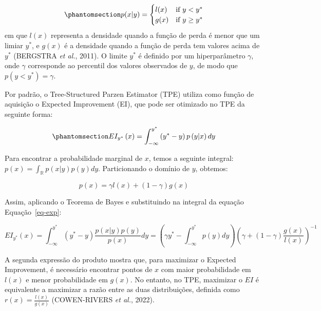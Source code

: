 \documentclass[
  12pt,
  a4paper,
]{scrreprt}
\begin{document}
\begin{equation}\phantomsection\label{eq-tpe}{
p(x|y) =
\begin{cases}
    l(x) & \text{if } y < y^* \\
    g(x) & \text{if } y \ge y^*
\end{cases}
}\end{equation} em que \(l\left(x\right)\) representa a densidade quando
a função de perda é menor que um limiar \(y^*\), e \(g\left(x\right)\) é
a densidade quando a função de perda tem valores acima de \(y^*\)
(BERGSTRA \emph{et al.}, 2011). O limite \(y^*\) é definido por um
hiperparâmetro \(\gamma\), onde \(\gamma\) corresponde ao percentil dos
valores observados de \(y\), de modo que
\(p\left(y < y^*\right) = \gamma\).

\vspace{12pt}

Por padrão, o Tree-Structured Parzen Estimator (TPE) utiliza como função
de aquisição o Expected Improvement (EI), que pode ser otimizado no TPE
da seguinte forma:

\begin{equation}\phantomsection\label{eq-exp}{
  EI_{y^*}\left(x\right) = \int_{-\infty}^{y^*} \left(y^* - y\right)p\left(y | x\right) dy
}\end{equation}

Para encontrar a probabilidade marginal de \(x\), temos a seguinte
integral:
\(p\left(x\right) = \int_{\mathbb{R}} p\left(x | y\right)p\left(y\right)dy\).
Particionando o domínio de \(y\), obtemos:

\[
p\left(x\right) = \gamma l\left(x\right) + \left(1 - \gamma \right) g\left(x\right)
\]

Assim, aplicando o Teorema de Bayes e substituindo na integral da
equação Equação~\ref{eq-exp}:

\[
EI_{y^*}\left(x\right) = \int_{-\infty}^{y^*} \left(y^* - y\right) \frac{p\left(x | y\right)p\left(y\right)}{p\left(x\right)}dy = \left(\gamma y^*  - \int_{-\infty}^{y^*} p\left(y\right)dy\right) \left(\gamma + \left(1 - \gamma\right)\frac{g\left(x\right)}{l\left(x\right)}\right) ^{-1}
\]

A segunda expressão do produto mostra que, para maximizar o Expected
Improvement, é necessário encontrar pontos de \(x\) com maior
probabilidade em \(l\left(x\right)\) e menor probabilidade em
\(g\left(x\right)\). No entanto, no TPE, maximizar o \(EI\) é
equivalente a maximizar a razão entre as duas distribuições, definida
como \(r\left(x\right) = \frac{l\left(x\right)}{g\left(x\right)}\)
(COWEN-RIVERS \emph{et al.}, 2022).
\end{document}
